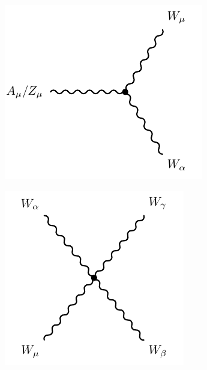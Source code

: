 \begin{figure}[!h]
\begin{subfigure}{0.33\textwidth}
   \includegraphics[width=\textwidth]{figures/zw2.pdf}
\end{subfigure} %
\begin{subfigure}{0.33\textwidth}
   \includegraphics[width=\textwidth]{figures/w4.pdf}

\end{subfigure}
\end{figure}
